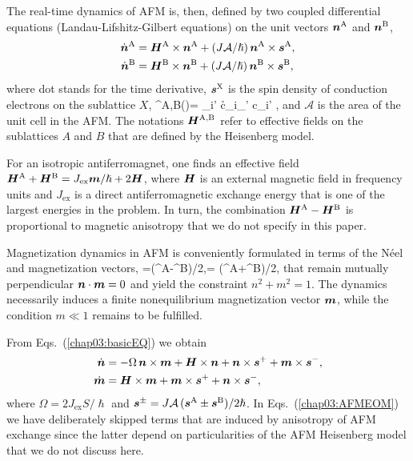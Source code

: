 The real-time dynamics of AFM is, then, defined by two coupled differential equations (Landau-Lifshitz-Gilbert equations) on the unit vectors $\boldsymbol{n}^\textrm{A}$ and $\boldsymbol{n}^\textrm{B}$, 
\beml
\label{chap03:basicEQ}
\begin{align}
\dot{\boldsymbol{n}}^\textrm{A} &= \boldsymbol{H}^\textrm{A}\times\boldsymbol{n}^\textrm{A}  + (J\mathcal{A}/\hslash)\,\boldsymbol{n}^\textrm{A}\times \boldsymbol{s}^\textrm{A},\\
\dot{\boldsymbol{n}}^\textrm{B}&= \boldsymbol{H}^\textrm{B}\times\boldsymbol{n}^\textrm{B} +(J\mathcal{A}/\hslash)\,\boldsymbol{n}^\textrm{B}\times \boldsymbol{s}^\textrm{B},
\end{align}
\eml
where dot stands for the time derivative, $\boldsymbol{s}^\textrm{X}$ is the spin density of conduction electrons on the sublattice $X$,
\be
{}^\textrm{A,B}()=  \s_{i\sigma\sigma'} \lt\la c\h_{i\sigma}\bb{\sigma}_{\sigma\sigma'} c\0_{i\sigma'} \rt\ra\;,
\e
and $\mathcal{A}$ is the area of the unit cell in the AFM. The notations $\boldsymbol{H}^\textrm{A,B}$ refer to effective fields on the sublattices $A$ and $B$ that are defined by the Heisenberg model. 

For an isotropic antiferromagnet, one finds an effective field \cite{Gomonay2014} $\boldsymbol{H}^\textrm{A}+\boldsymbol{H}^\textrm{B}= J_\textrm{ex}\boldsymbol{m}/\hslash+2\boldsymbol{H}$, where $\boldsymbol{H}$ is an external magnetic field in frequency units and $J_\textrm{ex}$ is a direct antiferromagnetic exchange energy that is one of the largest energies in the problem. In turn, the combination $\boldsymbol{H}^\textrm{A}-\boldsymbol{H}^\textrm{B}$ is proportional to magnetic anisotropy that we do not specify in this paper.  

Magnetization dynamics in AFM is conveniently formulated in terms of the N\'eel and magnetization vectors,
\be
{}=\lt(^\textrm{A}-^\textrm{B}\rt)/2,\qquad {}= \lt(^\textrm{A}+^\textrm{B}\rt)/2,
\e
that remain mutually perpendicular $\boldsymbol{n}\cdot \boldsymbol{m}=0$ and yield the constraint $n^2+m^2=1$. The dynamics necessarily induces a finite nonequilibrium magnetization vector $\boldsymbol{m}$, while the condition $m\ll 1$ remains to be fulfilled.  

From Eqs.~(\ref{chap03:basicEQ}) we obtain
\beml
\label{chap03:AFMEOM}
\begin{align}
\label{chap03:ndot}
\dot{\boldsymbol{n}} &= -\Omega\, \boldsymbol{n}\times\boldsymbol{m} +\boldsymbol{H}\times\boldsymbol{n}+\boldsymbol{n}\times\boldsymbol{s}^++\boldsymbol{m}\times\boldsymbol{s}^-,\\
\label{chap03:mdot}
\dot{\boldsymbol{m}} &= \boldsymbol{H}\times\boldsymbol{m}+\boldsymbol{m}\times\boldsymbol{s}^++\boldsymbol{n}\times\boldsymbol{s}^-,
\end{align}
\eml
where $\Omega=2J_\textrm{ex}S/\hslash$ and $\boldsymbol{s}^{\pm}= J \mathcal{A}\,(\boldsymbol{s}^\textrm{A}\pm\boldsymbol{s}^\textrm{B})/2\hslash$. In Eqs.~(\ref{chap03:AFMEOM}) we have deliberately skipped terms that are induced by anisotropy of AFM exchange since the latter depend on particularities of the AFM Heisenberg model that we do not discuss here.  


